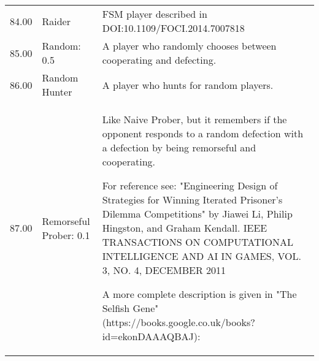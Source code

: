 \begin{table}[!hbtp]
\begin{adjustbox}{width=2\textwidth, angle=90}
\begin{tabular}{rll}
	84.00  & Raider                      & FSM player described in DOI:10.1109/FOCI.2014.7007818                                                                             \\
	85.00  & Random: 0.5                 & A player who randomly chooses between cooperating and defecting.                                                                  \\
	86.00  & Random Hunter               & A player who hunts for random players.                                                                                            \\
	87.00  & Remorseful Prober: 0.1      & Like Naive Prober, but it remembers if the opponent responds to a random
	defection with a defection by being remorseful and cooperating.

	For reference see: "Engineering Design of Strategies for Winning
	Iterated Prisoner's Dilemma Competitions" by Jiawei Li, Philip Hingston,
	and Graham Kendall.  IEEE TRANSACTIONS ON COMPUTATIONAL INTELLIGENCE AND AI
	IN GAMES, VOL. 3, NO. 4, DECEMBER 2011

	A more complete description is given in "The Selfish Gene"
	(https://books.google.co.uk/books?id=ekonDAAAQBAJ):


\end{tabular}
\end{adjustbox}
\end{table}
